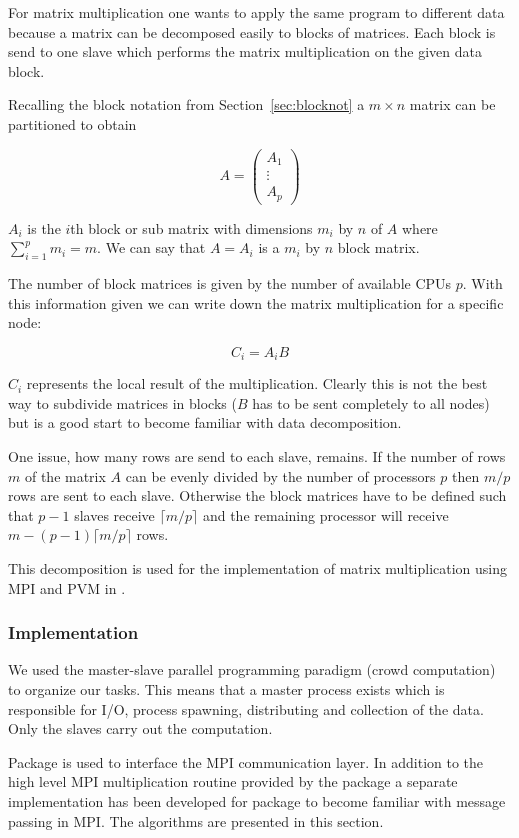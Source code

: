 For matrix multiplication one wants to apply the same
program to different data because a matrix can be decomposed
easily to blocks of matrices. Each block is send to one slave which
performs the matrix multiplication on the given data block.

Recalling the block notation from Section~\ref{sec:blocknot} a $m
\times n$ matrix can be partitioned to obtain

$$ A = \left( \begin{array}{ccc}
A_{1} \\
\vdots\\
A_{p}
\end{array} \right)
$$

$A_{i}$ is the $i$th block or sub matrix with dimensions $m_i$ by
$n$ of $A$ where $\sum_{i=1}^p m_i = m$. 
We can say that $A = A_{i}$ is a $m_i$ by $n$ block
matrix. 

The number of block matrices is given by the number of available
CPUs $p$. With this information given we can write down the matrix
multiplication for a specific node:

$$ C_{i} = A_{i}B $$

$C_{i}$ represents the local result of the multiplication. Clearly
this is not the best way to subdivide matrices in blocks ($B$ has to
be sent completely to all nodes) but is a good start to become
familiar with data decomposition.

One issue, how many rows are send to each slave, remains. If the
number of rows $m$ of the matrix $A$ can be evenly divided by the number
of processors $p$ then $m/p$ rows are sent to each slave. Otherwise
the block matrices have to be defined such that 
$p - 1$ slaves receive $\lceil m/p \rceil$ and the remaining processor
will receive $m - (p - 1) \lceil m/p \rceil$ rows.

This decomposition is used for the implementation of matrix
multiplication using MPI and PVM in .

\subsubsection{Implementation}

We used the master-slave parallel programming paradigm (crowd
computation) to organize our tasks. This means that a master process
exists which is responsible for I/O, process spawning, distributing
and collection of the data. Only the slaves carry out the
computation.

Package  is used to interface the MPI communication
layer. In addition to the high level MPI multiplication routine 
 provided by the package  a separate implementation has
been developed for package  to become familiar with message
passing in MPI. The algorithms are presented in this section.


